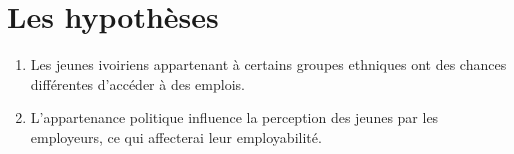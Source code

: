 \documentclass[12pt,a4paper, openany]{book}
\begin{document}
\section{Les hypothèses}
\begin{enumerate}[label=\arabic*)]
	\item Les jeunes ivoiriens appartenant à certains groupes ethniques ont des chances différentes d'accéder à des emplois.
	\item L'appartenance politique influence la perception des jeunes par les employeurs, ce qui affecterai leur employabilité. 
\end{enumerate}

	\nocite{*}
	
	
	
	\tableofcontents
	
\end{document}
